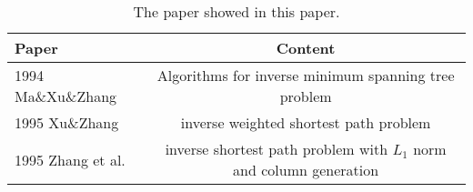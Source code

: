 \documentclass[UTF8]{article}
\begin{document}
\begin{table}[ht]
 
 \tabcolsep=40pt
 
 \small\renewcommand{}
 
 \caption{The paper showed in this paper.\label{tab:9}}
 
 {\begin{tabular}{lc}
   \hline
   Paper               & Content                                                             \\
   \hline
   1994  Ma\&Xu\&Zhang & Algorithms for inverse minimum spanning tree problem                \\
   \hline
   1995 Xu\&Zhang      & inverse weighted shortest path problem                              \\
   \hline
   1995 Zhang et al.   & inverse shortest path problem with $L_1$ norm and column generation \\
   \hline
  \end{tabular}}
 {}
\end{table}
\end{document}
